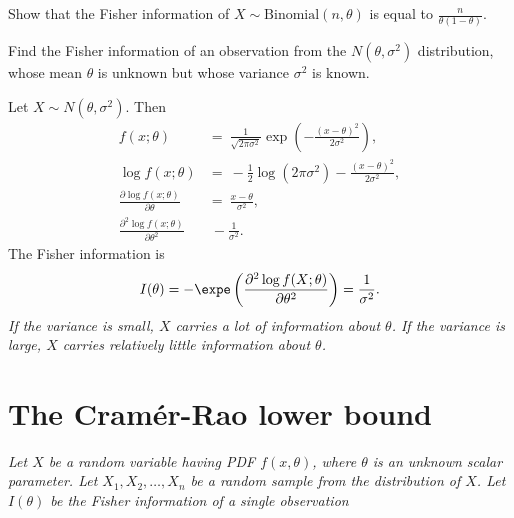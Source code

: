 \begin{exercise}
Show that the Fisher information of $X\sim\text{Binomial}(n,\theta)$ is equal to
$\displaystyle\frac{n}{\theta(1-\theta)}$.
\end{exercise}



\begin{example}
Find the Fisher information of an observation from the $N(\theta,\sigma^2)$ distribution, whose mean $\theta$ is unknown but whose variance $\sigma^2$ is known. 

\vspace*{1ex}
\begin{solution}
Let $X\sim N(\theta,\sigma^2)$. Then
\begin{align*}
f(x;\theta) 
	& = \ \frac{1}{\sqrt{2\pi\sigma^2}}\exp\left(-\frac{(x-\theta)^2}{2\sigma^2}\right), \\
\log f(x;\theta) 
	& = \ -\frac{1}{2}\log(2\pi\sigma^2) - \frac{(x-\theta)^2}{2\sigma^2}, \\
\frac{\partial\log f(x;\theta)}{\partial\theta} 
	& = \ \frac{x-\theta}{\sigma^2}, \\
\frac{\partial^2\log f(x;\theta)}{\partial\theta^2} 
	& \ -\frac{1}{\sigma^2}.
\end{align*}
The Fisher information is 
\[
I(\theta)
	= -\expe\left(\frac{\partial^2\log f(X;\theta)}{\partial\theta^2}\right)
	= \frac{1}{\sigma^2}.
\]
\bit
\it If the variance is small, $X$ carries a lot of information about $\theta$.
\it If the variance is large, $X$ carries relatively little information about $\theta$.
\eit
\end{solution}
\end{example}


\section{The Cram\'{e}r-Rao lower bound}
\bit
\it Let $X$ be a random variable having PDF $f(x,\theta)$, where $\theta$ is an unknown scalar parameter. 
\it Let $X_1,X_2,\ldots,X_n$ be a random sample from the distribution of $X$. 
\it Let $I(\theta)$ be the Fisher information of a single observation
\eit

